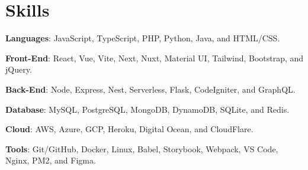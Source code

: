 \documentclass[letterpaper,12pt]{article}
\begin{document}
\section{Skills}
 \begin{itemize}[leftmargin=0.15in, label={}]
    \small{\item{
    
     \textbf{Languages}{: JavaScript, TypeScript, PHP, Python, Java, and HTML/CSS.}
     
     \textbf{Front-End}{: React, Vue, Vite, Next, Nuxt, Material UI, Tailwind, Bootstrap, and jQuery.}

     \textbf{Back-End}{: Node, Express, Nest, Serverless, Flask, CodeIgniter, and GraphQL.}

     \textbf{Database}{: MySQL, PostgreSQL, MongoDB, DynamoDB, SQLite, and Redis.}

     \textbf{Cloud}{: AWS, Azure, GCP, Heroku, Digital Ocean, and CloudFlare.}
     
     \textbf{Tools}{: Git/GitHub, Docker, Linux, Babel, Storybook, Webpack, VS Code, Nginx, PM2, and Figma.}
     
    }}
 \end{itemize}
\end{document}
